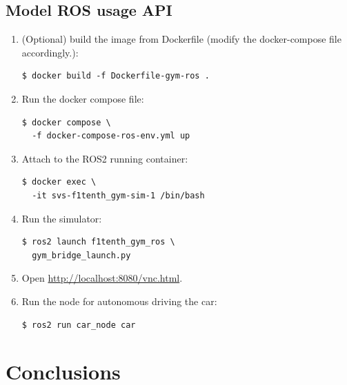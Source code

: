 \documentclass[conference]{IEEEtran}
\begin{document}
%
%
%
\subsection{Model ROS usage API}

\begin{enumerate}
    \item (Optional) build the image from Dockerfile (modify the docker-compose file accordingly.):
\begin{verbatim}
$ docker build -f Dockerfile-gym-ros .
\end{verbatim}

    \item Run the docker compose file:
\begin{verbatim}
$ docker compose \
  -f docker-compose-ros-env.yml up
\end{verbatim}

    \item Attach to the ROS2 running container:
\begin{verbatim}
$ docker exec \
  -it svs-f1tenth_gym-sim-1 /bin/bash
\end{verbatim}

    \item Run the simulator:
\begin{verbatim}
$ ros2 launch f1tenth_gym_ros \
  gym_bridge_launch.py
\end{verbatim}

    \item Open \url{http://localhost:8080/vnc.html}.

    \item Run the node for autonomous driving the car:
\begin{verbatim}
$ ros2 run car_node car
\end{verbatim}
\end{enumerate}

%
%
%
\section{Conclusions}



\end{document}
